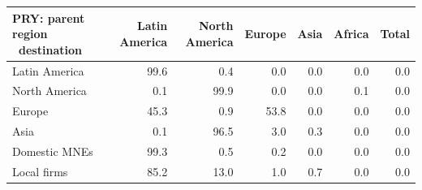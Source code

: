 \begin{tabular}{lrrrrrr}
\toprule
PRY: parent region \ destination & Latin America & North America & Europe & Asia & Africa & Total \\
\midrule
Latin America & 99.6 & 0.4 & 0.0 & 0.0 & 0.0 & 0.0 \\
North America & 0.1 & 99.9 & 0.0 & 0.0 & 0.1 & 0.0 \\
Europe & 45.3 & 0.9 & 53.8 & 0.0 & 0.0 & 0.0 \\
Asia & 0.1 & 96.5 & 3.0 & 0.3 & 0.0 & 0.0 \\
Domestic MNEs & 99.3 & 0.5 & 0.2 & 0.0 & 0.0 & 0.0 \\
Local firms & 85.2 & 13.0 & 1.0 & 0.7 & 0.0 & 0.0 \\
\bottomrule
\end{tabular}
